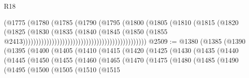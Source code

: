\begin{lexlean}{R18}
\begin{coremodule}
                                                                (@1775
                                                                  (@1780
                                                                    (@1785
                                                                      (@1790
                                                                        (@1795
                                                                          (@1800
                                                                            (@1805
                                                                              (@1810
                                                                                (@1815
                                                                                  (@1820
                                                                                    (@1825
                                                                                      (@1830
                                                                                        (@1835
                                                                                          (@1840
                                                                                            (@1845
                                                                                              (@1850
                                                                                                (@1855
                                                                                                  @2413)))))))))))))))))))))))))))))))))))))))))))))))
@2509 := @1380
    (@1385
      (@1390
        (@1395
          (@1400
            (@1405
              (@1410
                (@1415
                  (@1420
                    (@1425
                      (@1430
                        (@1435
                          (@1440
                            (@1445
                              (@1450
                                (@1455
                                  (@1460
                                    (@1465
                                      (@1470
                                        (@1475
                                          (@1480
                                            (@1485
                                              (@1490
                                                (@1495
                                                  (@1500
                                                    (@1505
                                                      (@1510
                                                        (@1515

\end{coremodule}
\end{lexlean}
